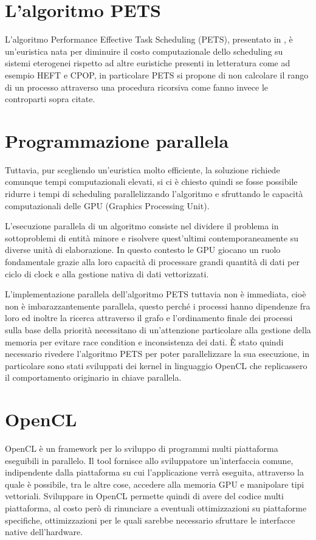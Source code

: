 
\section{L'algoritmo PETS}
L'algoritmo Performance Effective Task Scheduling (PETS), presentato in \cite{ilavarasan2007low}, è un'euristica nata per diminuire il costo computazionale dello scheduling su sistemi eterogenei rispetto ad altre euristiche presenti in letteratura come ad esempio HEFT\cite{993206} e CPOP\cite{993206}, in particolare PETS si propone di non calcolare il rango di un processo attraverso una procedura ricorsiva come fanno invece le controparti sopra citate.

\section{Programmazione parallela}
Tuttavia, pur scegliendo un'euristica molto efficiente, la soluzione richiede comunque tempi computazionali elevati, si ci è chiesto quindi se fosse possibile ridurre i tempi di scheduling parallelizzando l'algoritmo e sfruttando le capacità computazionali delle GPU (Graphics Processing Unit).

L'esecuzione parallela di un algoritmo consiste nel dividere il problema in sottoproblemi di entità minore e risolvere quest'ultimi contemporaneamente su diverse unità di elaborazione. In questo contesto le GPU giocano un ruolo fondamentale grazie alla loro capacità di processare grandi quantità di dati per ciclo di clock e alla gestione nativa di dati vettorizzati.

L'implementazione parallela dell'algoritmo PETS tuttavia non è immediata, cioè non è imbarazzantemente parallela, questo perché i processi hanno dipendenze fra loro ed inoltre la ricerca attraverso il grafo e l'ordinamento finale dei processi sulla base della priorità necessitano di un'attenzione particolare alla gestione della memoria per evitare race condition e inconsistenza dei dati.
È stato quindi necessario rivedere l'algoritmo PETS per poter parallelizzare la sua esecuzione, in particolare sono stati sviluppati dei kernel in linguaggio OpenCL che replicassero il comportamento originario in chiave parallela.

\section{OpenCL}
OpenCL\cite{opencl} è un framework per lo sviluppo di programmi multi piattaforma eseguibili in parallelo. Il tool fornisce allo sviluppatore un'interfaccia comune, indipendente dalla piattaforma su cui l'applicazione verrà eseguita, attraverso la quale è possibile, tra le altre cose, accedere alla memoria GPU e manipolare tipi vettoriali.
Sviluppare in OpenCL permette quindi di avere del codice multi piattaforma, al costo però di rinunciare a eventuali ottimizzazioni su piattaforme specifiche, ottimizzazioni per le quali sarebbe necessario sfruttare le interfacce native dell'hardware.



